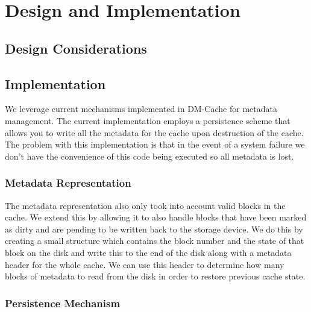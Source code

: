 \section{Design and Implementation}
\label{sec:implementation}

\subsection{Design Considerations}

\subsection{Implementation}

We leverage current mechanisms implemented in DM-Cache for metadata
management. The current implementation employs a persistence scheme
that allows you to write all the metadata for the cache upon
destruction of the cache. The problem with this implementation is that
in the event of a system failure we don't have the convenience of this
code being executed so all metadata is lost.

\subsubsection{Metadata Representation}

The metadata representation also only took into account valid blocks
in the cache. We extend this by allowing it to also handle blocks that
have been marked as dirty and are pending to be written back to the
storage device. We do this by creating a small structure which
contains the block number and the state of that block on the disk and
write this to the end of the disk along with a metadata header for the
whole cache. We can use this header to determine how many blocks of
metadata to read from the disk in order to restore previous cache
state.

\subsubsection{Persistence Mechanism}

